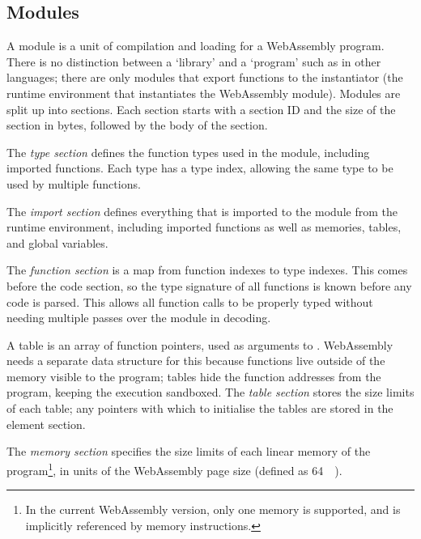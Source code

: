 \documentclass[00-main.tex]{subfiles}
\begin{document}
%
%

\subsection{Modules}

A module is a unit of compilation and loading for a WebAssembly program.
There is no distinction between a `library' and a `program' such as in other languages; there are only modules that export functions to the instantiator (the runtime environment that instantiates the WebAssembly module).
Modules are split up into sections.
Each section starts with a section ID and the size of the section in bytes, followed by the body of the section.

The \emph{type section} defines the function types used in the module, including imported functions.
Each type has a type index, allowing the same type to be used by multiple functions.

The \emph{import section} defines everything that is imported to the module from the runtime environment, including imported functions as well as memories, tables, and global variables.

The \emph{function section} is a map from function indexes to type indexes.
This comes before the code section, so the type signature of all functions is known before any code is parsed.
This allows all function calls to be properly typed without needing multiple passes over the module in decoding.

A table is an array of function pointers, used as arguments to .
WebAssembly needs a separate data structure for this because functions live outside of the memory visible to the program; tables hide the function addresses from the program, keeping the execution sandboxed.
The \emph{table section} stores the size limits of each table; any pointers with which to initialise the tables are stored in the element section.

The \emph{memory section} specifies the size limits of each linear memory of the program\footnote{In the current WebAssembly version, only one memory is supported, and is implicitly referenced by memory instructions.}, in units of the WebAssembly page size (defined as \SI{64}{\kibi\byte}).
\end{document}
